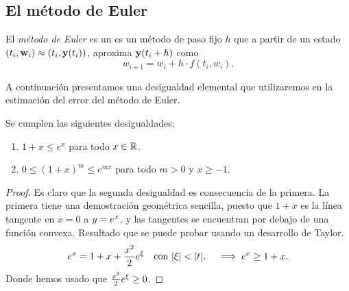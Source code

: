 \subsection{El método de Euler}

\begin{method}\label{met:euler}
    El \emph{método de Euler} es un es un método de paso fijo $h$ que
    a partir de un estado $(t_i, \vb{w}_i) \approx (t_i, \vb{y}(t_i))$,
    aproxima $\vb{y}(t_i + h)$ como
    \begin{equation*}
        w_{i+1} = w_i + h\cdot f(t_i, w_i).
    \end{equation*}
\end{method}

A continuación presentamos una desigualdad elemental que utilizaremos
en la estimación del error del método de Euler.

\begin{lemma}\label{lma:tangent-exponential}
    Se cumplen las siguientes desigualdades:
    \begin{enumerate}
        \item $1 + x \le e^x$ para todo $x \in \mathbb{R}$.
        \item $0 \le (1+x)^m \le e^{mx}$ para todo $m > 0$ y $x \ge -1$.
    \end{enumerate} 
\end{lemma}

\begin{proof}
    Es claro que la segunda desigualdad es consecuencia de la primera.
    La primera tiene una demostración geométrica sencilla,
    puesto que $1 + x$ es la línea tangente en $x = 0$ a $y = e^x$,
    y las tangentes se encuentran por debajo de una función convexa.
    Resultado que se puede probar usando un desarrollo de Taylor.
    \begin{equation*}
        \nume^x = 1 + x + \frac{x^2}{2}\nume^\xi \qq{con $\abs{\xi} < \abs{t}.$}
        \implies \nume^x \ge 1+ x.
    \end{equation*}
    Donde hemos usado que $\frac{x^2}{2}e^\xi \ge 0$.
\end{proof}


